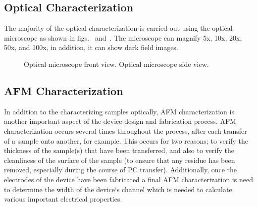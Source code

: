 \subsection{Optical Characterization}\label{subsec:characterization_optical}
The majority of the optical characterization is carried out using the optical microscope as shown in figs.~ and~. The microscope can magnify 5x, 10x, 20x, 50x, and 100x, in addition, it can show dark field images.
\begin{figure}[ht]
	\centering
	\qquad
	\caption[Optical microscope]{\protect{} Optical microscope front view. \protect{} Optical microscope side view.}
\end{figure}

\subsection{AFM Characterization}\label{subsec:characterization_afm}
In addition to the characterizing samples optically, \acs{AFM} characterization is another important aspect of the device design and fabrication process. \acs{AFM} characterization occurs several times throughout the process, after each transfer of a sample onto another, for example. This occurs for two reasons; to verify the thickness of the sample(s) that have been transferred, and also to verify the cleanliness of the surface of the sample (to ensure that any residue has been removed, especially during the course of PC transfer). Additionally, once the electrodes of the device have been fabricated a final \acs{AFM} characterization is need to determine the width of the device`s channel which is needed to calculate various important electrical properties. \\ \\

